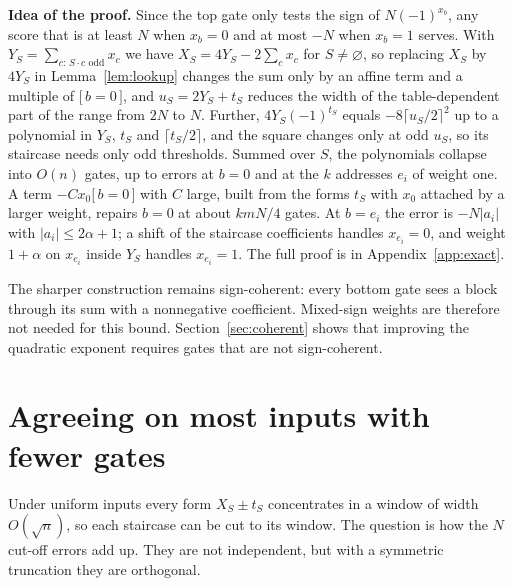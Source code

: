 \documentclass[11pt,letterpaper]{article}
\theoremstyle{remark}
\newcommand{\ind}[1]{\bigl[\,#1\,\bigr]}
\newcommand{\sect}[1]{\section{\texorpdfstring{\color{ink}#1}{#1}}}
\newcommand{\smalltitle}[1]{\textbf{\color{ink}#1}\quad}
\begin{document}
\smalltitle{Idea of the proof.}
Since the top gate only tests the sign of $N(-1)^{x_b}$, any score that is
at least $N$ when $x_b=0$ and at most $-N$ when $x_b=1$ serves. With
$Y_S=\sum_{c:\,S\cdot c\text{ odd}}x_c$ we have $X_S=4Y_S-2\sum_cx_c$ for
$S\ne\varnothing$, so replacing $X_S$ by $4Y_S$ in Lemma~\ref{lem:lookup}
changes the sum only by an affine term and a multiple of $\ind{b=0}$, and
$u_S=2Y_S+t_S$ reduces the width of the table-dependent part of the range
from $2N$ to $N$. Further, $4Y_S(-1)^{t_S}$
equals $-8\lceil u_S/2\rceil^2$ up to a polynomial in $Y_S$, $t_S$ and
$\lceil t_S/2\rceil$, and the square changes only at odd $u_S$, so its
staircase needs only odd thresholds. Summed over $S$, the polynomials collapse
into $O(n)$ gates, up to errors at $b=0$ and at the $k$ addresses $e_i$ of
weight one. A term $-Cx_0\ind{b=0}$ with $C$ large, built from the forms
$t_S$ with $x_0$ attached by a larger weight, repairs $b=0$ at about $kmN/4$
gates. At $b=e_i$ the error is $-N|a_i|$
with $|a_i|\le2\alpha+1$; a shift of the staircase coefficients handles
$x_{e_i}=0$, and weight $1+\alpha$ on $x_{e_i}$ inside $Y_S$ handles
$x_{e_i}=1$. The full proof is in Appendix~\ref{app:exact}.

The sharper construction remains sign-coherent: every bottom gate sees a block
through its sum with a nonnegative coefficient. Mixed-sign weights
are therefore not needed for this bound. Section~\ref{sec:coherent} shows
that improving the quadratic exponent requires gates that are not
sign-coherent.


\sect{Agreeing on most inputs with fewer gates}\label{sec:avgupper}

Under uniform inputs every form $X_S\pm t_S$ concentrates in a window of
width $O(\sqrt n)$, so each staircase can be cut to its window. The question
is how the $N$ cut-off errors add up. They are not independent, but with a
symmetric truncation they are orthogonal.
\end{document}
